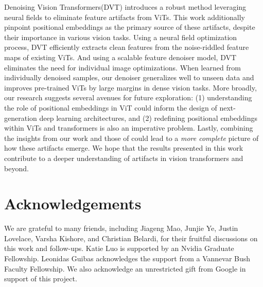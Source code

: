 \documentclass[runningheads]{llncs}
\newcommand{\ours}{DVT\xspace}
\newcommand{\ourslong}{Denoising Vision Transformers\xspace}
\begin{document}
\ourslong (\ours) introduces a robust method leveraging neural fields to eliminate feature artifacts from ViTs. This work additionally pinpoint positional embeddings as the primary source of these artifacts, despite their importance in various vision tasks. Using a neural field optimization process, \ours efficiently extracts clean features from the noise-riddled feature maps of existing ViTs. And using a scalable feature denoiser model, \ours eliminates the need for individual image optimizations. When learned from individually denoised samples, our denoiser generalizes well to unseen data and improves pre-trained ViTs by large margins in dense vision tasks. More broadly, our research suggests several avenues for future exploration: (1) understanding the role of positional embeddings in ViT could inform the design of next-generation deep learning architectures, and (2) redefining positional embeddings within ViTs and transformers is also an imperative problem. Lastly, combining the insights from our work and those of \cite{darcet2023vision} could lead to a \textit{more complete} picture of how these artifacts emerge. We hope that the results presented in this work contribute to a deeper understanding of artifacts in vision transformers and beyond.
 

\section*{Acknowledgements}
We are grateful to many friends,
including Jiageng Mao, Junjie Ye, Justin Lovelace, Varsha Kishore, and Christian Belardi, for their fruitful discussions on this work and follow-ups. Katie Luo is supported by an Nvidia Graduate Fellowship. Leonidas Guibas acknowledges the support from a Vannevar Bush Faculty Fellowship. We also acknowledge an unrestricted gift from Google in support of this project.
\end{document}
